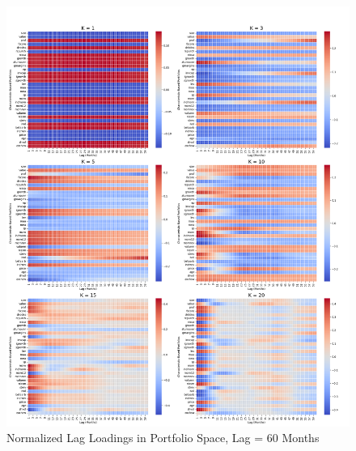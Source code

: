 \documentclass{article}
\begin{document}
\begin{figure}[H]
    \centering
    \includegraphics[width=1\linewidth]{WB_60_norm.png}
    \caption{Normalized Lag Loadings in Portfolio Space, Lag = 60 Months}
    \label{fig:WB_60_norm}
\end{figure}
\end{document}
